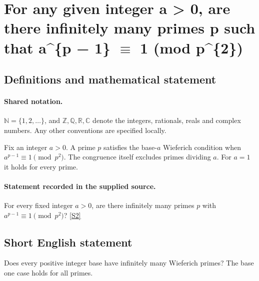 \documentclass[11pt]{article}
\newcommand{\sref}[2]{\hyperlink{source:#1:#2}{[S#2]}}
\begin{document}
\section{\texorpdfstring{For any given integer a > 0, are there infinitely many primes p such that a\textasciicircum{}\{p − 1\} $\equiv$ 1 (mod p\textasciicircum{}\{2\})}{For any given integer a > 0, are there infinitely many primes p such that a\textasciicircum{}\{p − 1\} congruent to 1 (mod p\textasciicircum{}\{2\})}}\label{statement}

\subsection{Definitions and mathematical statement}

\paragraph{Shared notation.}$\mathbb N=\{1,2,\ldots\}$, and $\mathbb Z,\mathbb Q,\mathbb R,\mathbb C$ denote the integers, rationals, reals and complex numbers. Any other conventions are specified locally.


Fix an integer $a>0$. A prime $p$ satisfies the base-$a$ Wieferich condition when $a^{p-1}\equiv1\pmod{p^2}$. The congruence itself excludes primes dividing $a$. For $a=1$ it holds for every prime.
\paragraph{Statement recorded in the supplied source.}
For every fixed integer $a>0$, are there infinitely many primes $p$ with $a^{p-1}\equiv1\pmod{p^2}$? \sref{statement}{2}
\subsection{Short English statement}
Does every positive integer base have infinitely many Wieferich primes? The base one case holds for all primes.
\end{document}
